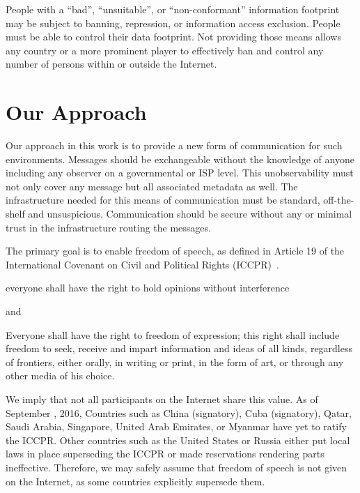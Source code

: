 People with a ``bad'', ``unsuitable'', or ``non-conformant'' information footprint may be subject to banning, repression, or information access exclusion. People must be able to control their data footprint. Not providing those means allows any country or a more prominent player to effectively ban and control any number of persons within or outside the Internet. 

\section{Our Approach}
Our approach in this work is to provide a new form of communication for such environments. Messages should be exchangeable without the knowledge of anyone including any observer on a governmental or ISP level. This unobservability must not only cover any message but all associated metadata as well. The infrastructure needed for this means of communication must be standard, off-the-shelf and unsuspicious. Communication should be secure without any or minimal trust in the infrastructure routing the messages.

The primary goal is to enable freedom of speech, as defined in Article 19 of the International Covenant on Civil and Political Rights (ICCPR)~\cite{iccpr}.
\begin{shadequote}{}
		everyone shall have the right to hold opinions without interference 
\end{shadequote}
and
\begin{shadequote}{}
	Everyone shall have the right to freedom of expression; this right shall include freedom to seek, receive and impart information and ideas of all kinds, regardless of frontiers, either orally, in writing or print, in the form of art, or through any other media of his choice.
\end{shadequote}

We imply that not all participants on the Internet share this value. As of September , 2016, %
Countries such as China (signatory), Cuba (signatory), Qatar, Saudi Arabia, Singapore, United Arab Emirates, or Myanmar have yet to ratify the ICCPR. Other countries such as the United States or Russia either put local laws in place superseding the ICCPR or made reservations rendering parts ineffective. Therefore, we may safely assume that freedom of speech is not given on the Internet, as some countries explicitly supersede them.


